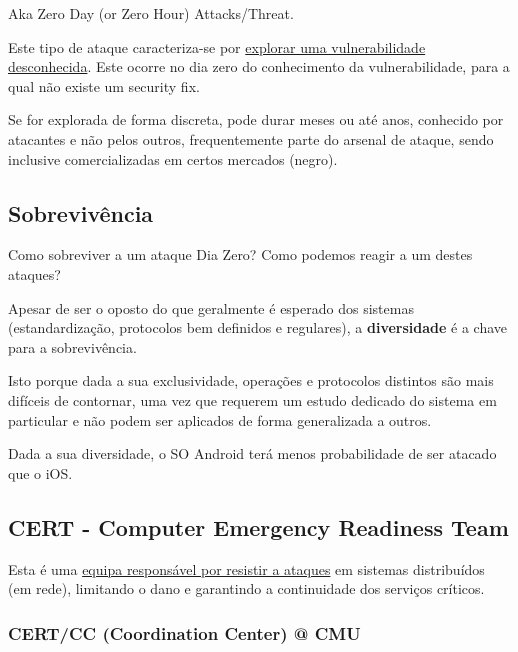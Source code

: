 \documentclass{article}
\begin{document}
  Aka Zero Day (or Zero Hour) Attacks/Threat.

  \vspace{2mm}

  Este tipo de ataque caracteriza-se por \uline{explorar uma vulnerabilidade desconhecida}.
  Este ocorre no dia zero do conhecimento da vulnerabilidade, para a qual não existe
  um security fix.

  \vspace{2mm}

  Se for explorada de forma discreta, pode durar meses ou até anos, conhecido
  por atacantes e não pelos outros, frequentemente parte do arsenal de ataque, sendo inclusive
  comercializadas em certos mercados (negro).

  \subsection{Sobrevivência}

  Como sobreviver a um ataque Dia Zero? Como podemos reagir a um destes ataques?

  \vspace{2mm}

  Apesar de ser o oposto do que geralmente é esperado dos sistemas (estandardização,
protocolos bem definidos e regulares), a \textbf{diversidade} é a chave para a sobrevivência.

\vspace{2mm}

Isto porque dada a sua exclusividade, operações e protocolos distintos são mais difíceis de
contornar, uma vez que requerem um estudo dedicado do sistema em particular e não podem
ser aplicados de forma generalizada a outros.

\vspace{2mm}

Dada a sua diversidade, o SO Android terá menos probabilidade de ser atacado que o iOS.

\subsection{CERT - Computer Emergency Readiness Team}

Esta é uma \uline{equipa responsável por resistir a ataques} em sistemas distribuídos (em rede),
limitando o dano e garantindo a continuidade dos serviços críticos.

\vspace{2mm}

\subsubsection*{CERT/CC (Coordination Center) @ CMU}
\end{document}
